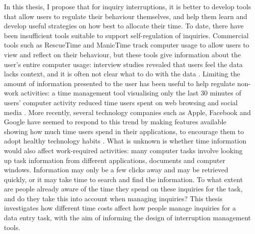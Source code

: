 In this thesis, I propose that for inquiry interruptions, it is better to develop tools that allow users to regulate their behaviour themselves, and help them learn and develop useful strategies on how best to allocate their time. To date, there have been insufficient tools suitable to support self-regulation of inquiries. Commercial tools such as RescueTime \citep{RescueTime} and ManicTime \citep{ManicTime} track computer usage to allow users to view and reflect on their behaviour, but these tools give information about the user’s entire computer usage: interview studies revealed that users feel the data lacks context, and it is often not clear what to do with the data \citep{Collins2014}. Limiting the amount of information presented to the user has been useful to help regulate non-work activities: a time management tool visualising only the last 30 minutes of users' computer activity reduced time users spent on web browsing and social media \citep{Whittaker2016}. More recently, several technology companies such as Apple, Facebook and Google have seemed to respond to this trend by making features available showing how much time users spend in their applications, to encourage them to adopt healthy technology habits \citep{Apple2018, Constine2018, Constine2018a, Lynley2018}. What is unknown is whether time information would also affect work-required activities: many computer tasks involve looking up task information from different applications, documents and computer windows. Information may only be a few clicks away and may be retrieved quickly, or it may take time to search and find the information. To what extent are people already aware of the time they spend on these inquiries for the task, and do they take this into account when managing inquiries? This thesis investigates how different time costs affect how people manage inquiries for a data entry task, with the aim of informing the design of interruption management tools.



